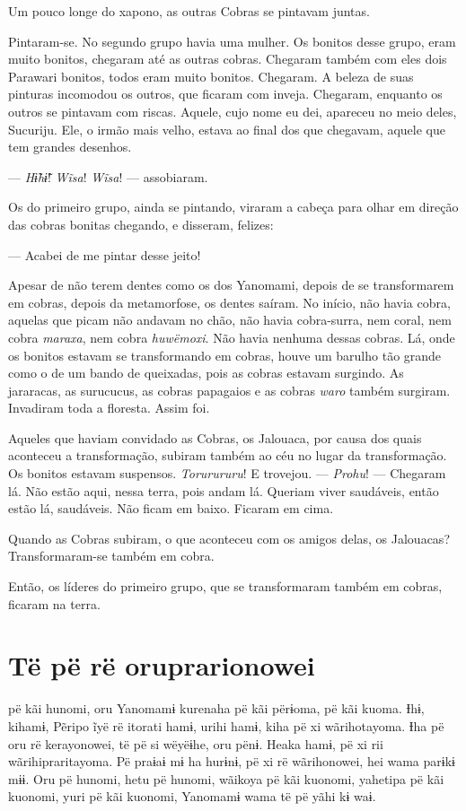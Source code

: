 Um pouco longe do xapono, as outras Cobras se pintavam juntas. 

Pintaram-se. No segundo grupo havia uma mulher. Os bonitos desse
grupo, eram muito bonitos, chegaram até as outras cobras. Chegaram
também com eles dois Parawari bonitos, todos eram muito bonitos.
Chegaram. A beleza de suas pinturas incomodou os outros, que ficaram com
inveja. Chegaram, enquanto os outros se pintavam com riscas. Aquele,
cujo nome eu dei, apareceu no meio deles, Sucuriju. Ele, o irmão mais
velho, estava ao final dos que chegavam, aquele que tem grandes
desenhos.

--- \textit{Hɨ̃hɨ̃}! \textit{Wĩsa}! \textit{Wĩsa}! --- assobiaram. 

Os do primeiro grupo, ainda se pintando, viraram a cabeça para olhar em
direção das cobras bonitas chegando, e disseram, felizes:

--- Acabei de me pintar desse jeito! 

Apesar de não terem dentes como os dos Yanomami, depois de se
transformarem em cobras, depois da metamorfose, os dentes saíram. No
início, não havia cobra, aquelas que picam não andavam no chão, não
havia cobra-surra, nem coral, nem cobra \textit{maraxa}, nem
cobra \textit{huwëmoxi}. Não havia nenhuma dessas cobras. Lá, onde os
bonitos estavam se transformando em cobras, houve um barulho tão grande
como o de um bando de queixadas, pois as cobras estavam surgindo. As
jararacas, as surucucus, as cobras papagaios e as
cobras \textit{waro} também surgiram. Invadiram toda a floresta. Assim foi. 

Aqueles que haviam convidado as Cobras, os Jalouaca, por causa dos quais
aconteceu a transformação, subiram também ao céu no lugar da
transformação. Os bonitos estavam suspensos. \textit{Torurururu}! E
trovejou. --- \textit{Prohu}! --- Chegaram lá. Não estão aqui, nessa terra,
pois andam lá. Queriam viver saudáveis, então estão lá, saudáveis. Não
ficam em baixo. Ficaram em cima. 

Quando as Cobras subiram, o que aconteceu com os amigos delas, os
Jalouacas? Transformaram-se também em cobra. 

Então, os líderes do primeiro grupo, que se transformaram também
em cobras, ficaram na terra.

\chapter{Të pë rë oruprarionowei}
 
 pë kãi hunomi, oru Yanomamɨ kurenaha pë kãi përɨoma, pë kãi kuoma.
Ɨhɨ, kihamɨ, Pẽripo ĩyë rë itorati hamɨ, urihi hamɨ, kiha pë xi
wãrihotayoma. Ɨha pë oru rë kerayonowei, të pë si wëyëɨhe, oru pënɨ.
Heaka hamɨ, pë xi rii wãrihipraritayoma. Pë praɨaɨ mɨ ha hurɨnɨ, pë xi
rë wãrihonowei, hei wama parɨkɨ mɨɨ. Oru pë hunomi, hetu pë hunomi,
wãikoya pë kãi kuonomi, yahetipa pë kãi kuonomi, yuri pë kãi kuonomi,
Yanomamɨ wama të pë yãhi kɨ waɨ. 

